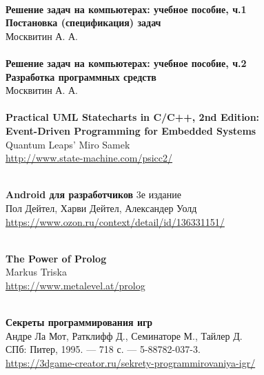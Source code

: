 \begin{thebibliography}{99}
\clearpage
{}\ \\
\textbf{Решение задач на компьютерах: учебное пособие, ч.1\\
Постановка (спецификация) задач }\\
Москвитин А. А.\\

\clearpage
{}\ \\
\textbf{Решение задач на компьютерах: учебное пособие, ч.2\\
Разработка программных средств}\\
Москвитин А. А.\\

\clearpage
{}\ \\
\textbf{Practical UML Statecharts in C/C++, 2nd Edition:\\
Event-Driven Programming for Embedded Systems}\\
Quantum Leaps' Miro Samek\\
\url{http://www.state-machine.com/psicc2/}

\clearpage
{}\ \\
\textbf{Android для разработчиков} 3е издание\\
Пол Дейтел, Харви Дейтел, Александер Уолд\\
\url{https://www.ozon.ru/context/detail/id/136331151/}

\clearpage
{}\ \\
\textbf{The Power of Prolog}\\
Markus Triska\\
\url{https://www.metalevel.at/prolog}

\clearpage
{}\ \\
\textbf{Секреты программирования игр}\\
Андре Ла Мот, Ратклифф Д., Семинаторе М., Тайлер Д.\\
СПб: Питер, 1995. — 718 с. — 5-88782-037-3.\\
\url{https://3dgame-creator.ru/sekrety-programmirovaniya-igr/}

\end{thebibliography}
